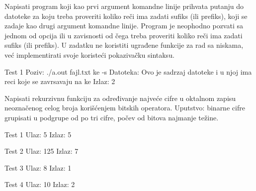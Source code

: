 \begin{Exercise}[label=307]
Napisati program koji kao prvi argument komandne linije prihvata
putanju do datoteke za koju treba proveriti koliko reči ima
zadati sufiks (ili prefiks), koji se zadaje kao drugi argument
komandne linije. Program je neophodno pozvati sa jednom od opcija
 ili  u zavisnosti od čega treba proveriti
koliko reči ima zadati sufiks (ili prefiks). U zadatku ne
koristiti ugrađene funkcije za rad sa niskama, već
implementirati svoje koristeći pokazivačku sintaksu.

\begin{miditest}
\begin{test}{Test 1}
Poziv:    ./a.out fajl.txt ke -s
Datoteka: Ovo je sadrzaj datoteke 
          i u njoj ima reci koje se 
          zavrsavaju na ke
Izlaz:    2
\end{test}
\end{miditest}
\end{Exercise}
\begin{Answer}[ref=307]
\end{Answer}

\begin{Exercise}[label=308]
Napisati rekurzivnu funkciju za određivanje
najveće cifre u oktalnom zapisu
neoznačenog celog broja korišćenjem bitskih operatora.
Uputstvo: binarne cifre grupisati u podgrupe od po tri cifre,
počev od bitova najmanje težine.

\begin{minitest}
\begin{test}{Test 1}
Ulaz:  5
Izlaz: 5
\end{test}
\end{minitest}
\begin{minitest}
\begin{test}{Test 2}
Ulaz:  125
Izlaz: 7
\end{test}
\end{minitest}
\begin{minitest}
\begin{test}{Test 3}
Ulaz:  8
Izlaz: 1
\end{test}
\end{minitest}

\begin{minitest}
\begin{test}{Test 4}
Ulaz:  10
Izlaz: 2
\end{test}
\end{minitest}
\end{Exercise}
\begin{Answer}[ref=308]
\end{Answer}

